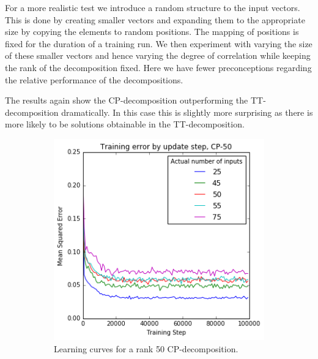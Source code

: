 {For a more realistic test we introduce a random structure to the input vectors. This is done by
creating smaller vectors and expanding them to the appropriate size by copying the
elements to random positions. The mapping of positions is fixed for the duration of a training
run. We then experiment with varying the size of these smaller vectors and hence varying the
degree of correlation while keeping the rank of the decomposition fixed. Here we have fewer
preconceptions regarding the relative performance of the decompositions.


The results again show the CP-decomposition outperforming the TT-decomposition dramatically.
In this case this is slightly more surprising as there is more likely to be solutions
obtainable in the TT-decomposition.


\begin{figure}
	\begin{subfigure}[t]{0.45\textwidth}
		\includegraphics[width=\textwidth]{tensors/correlatecp50-mom}
		\caption{Learning curves for a rank 50 CP-decomposition.}
	\end{subfigure}
	~
	\begin{subfigure}[t]{0.45\textwidth}

\end{subfigure}
\end{figure}}
